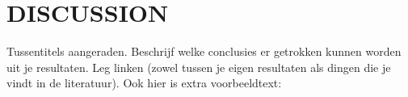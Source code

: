 \section{DISCUSSION}
Tussentitels aangeraden.
Beschrijf welke conclusies er getrokken kunnen worden uit je resultaten. 
Leg linken (zowel tussen je eigen resultaten als dingen die je vindt in de literatuur).
\npar
Ook hier is extra voorbeeldtext: \lipsum[1-1]